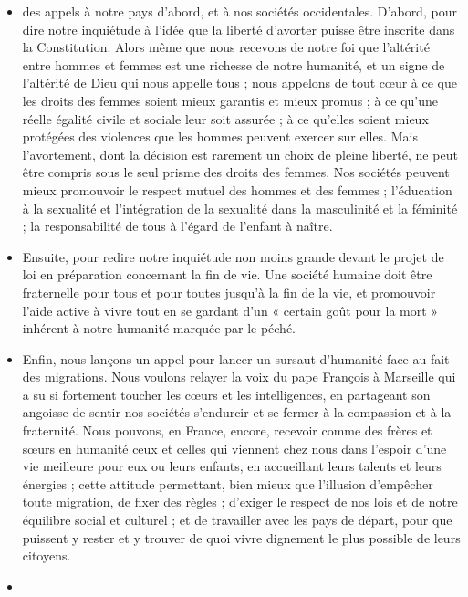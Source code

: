 \begin{itemize}
    \item 	des appels à notre pays d’abord, et à nos sociétés occidentales. D’abord, pour dire notre inquiétude à l’idée que la liberté d’avorter puisse être inscrite dans la Constitution. Alors même que nous recevons de notre foi que l’altérité entre hommes et femmes est une richesse de notre humanité, et un signe de l’altérité de Dieu qui nous appelle tous ; nous appelons de tout cœur à ce que les droits des femmes soient mieux garantis et mieux promus ; à ce qu’une réelle égalité civile et sociale leur soit assurée ; à ce qu’elles soient mieux protégées des violences que les hommes peuvent exercer sur elles. Mais l’avortement, dont la décision est rarement un choix de pleine liberté, ne peut être compris sous le seul prisme des droits des femmes. Nos sociétés peuvent mieux promouvoir le respect mutuel des hommes et des femmes ; l’éducation à la sexualité et l’intégration de la sexualité dans la masculinité et la féminité ; la responsabilité de tous à l’égard de l’enfant à naître.
        \item 
Ensuite, pour redire notre inquiétude non moins grande devant le projet de loi en préparation concernant la fin de vie. Une société humaine doit être fraternelle pour tous et pour toutes jusqu’à la fin de la vie, et promouvoir l’aide active à vivre tout en se gardant d’un « certain goût pour la mort » inhérent à notre humanité marquée par le péché.
            \item 
Enfin, nous lançons un appel pour lancer un sursaut d’humanité face au fait des migrations. Nous voulons relayer la voix du pape François à Marseille qui a su si fortement toucher les cœurs et les intelligences, en partageant son angoisse de sentir nos sociétés s’endurcir et se fermer à la compassion et à la fraternité. Nous pouvons, en France, encore, recevoir comme des frères et sœurs en humanité ceux et celles qui viennent chez nous dans l’espoir d’une vie meilleure pour eux ou leurs enfants, en accueillant leurs talents et leurs énergies ; cette attitude permettant, bien mieux que l’illusion d’empêcher toute migration, de fixer des règles ; d’exiger le respect de nos lois et de notre équilibre social et culturel ; et de travailler avec les pays de départ, pour que puissent y rester et y trouver de quoi vivre dignement le plus possible de leurs citoyens.
\item 

\end{itemize}
